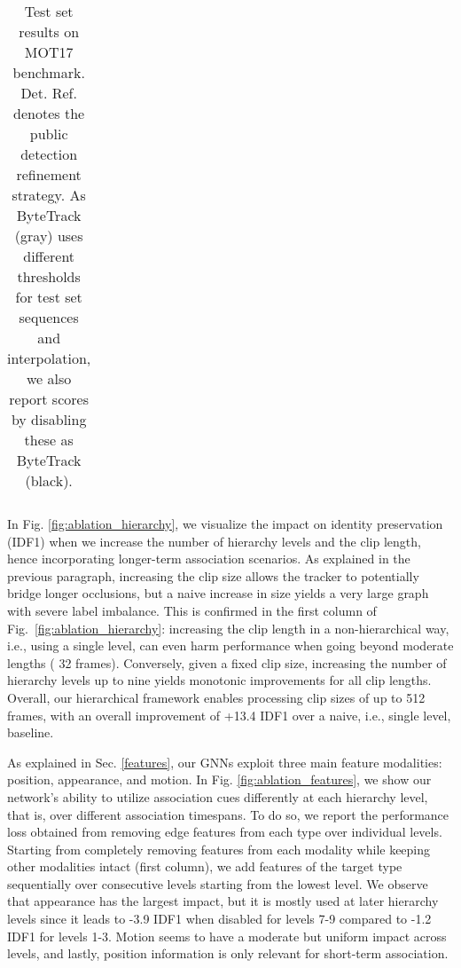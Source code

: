 \documentclass[10pt,twocolumn,letterpaper]{article}
\begin{document}
{{\begin{table}[h]
{\begin{tabular}{l l c c c c c c c c c}
     \midrule

    \end{tabular}}

\caption{Test set results on MOT17 benchmark. Det. Ref. denotes the public detection refinement strategy. As ByteTrack (gray) uses different thresholds for test set sequences and interpolation, we also report scores by disabling these as ByteTrack (black).}

\label{table:mot17}
\end{table}
  In Fig. \ref{fig:ablation_hierarchy}, we visualize the impact on identity preservation (IDF1) when we increase the number of hierarchy levels and the clip length, hence incorporating longer-term association scenarios. As explained in the previous paragraph, increasing the clip size allows the tracker to potentially bridge longer occlusions, but a naive increase in size yields a very large graph with severe label imbalance. 
This is confirmed in the first column of Fig.~\ref{fig:ablation_hierarchy}: increasing the clip length in a non-hierarchical way, i.e., using a single level, can even harm performance when going beyond moderate lengths ( 32 frames). Conversely, given a fixed clip size, increasing the number of hierarchy levels up to nine yields monotonic improvements for all clip lengths. Overall, our hierarchical framework enables processing clip sizes of up to 512 frames, with an overall improvement of +13.4 IDF1 over a naive, i.e., single level, baseline. 

 As explained in Sec. \ref{features}, our GNNs exploit three main feature modalities: position, appearance, and motion. In Fig. \ref{fig:ablation_features}, we show our network's ability to utilize association cues differently at each hierarchy level, that is, over different association timespans. 
To do so, we report the performance loss obtained from removing edge features from each type over individual levels. 
Starting from completely removing features from each modality while keeping other modalities intact (first column), we add features of the target type sequentially over consecutive levels starting from the lowest level. We observe that appearance has the largest impact, but it is mostly used at later hierarchy levels since it leads to -3.9 IDF1 when disabled for levels 7-9 compared to -1.2 IDF1 for levels 1-3. Motion seems to have a moderate but uniform impact across levels, and lastly, position information is only relevant for short-term association. 














}}
\end{document}
